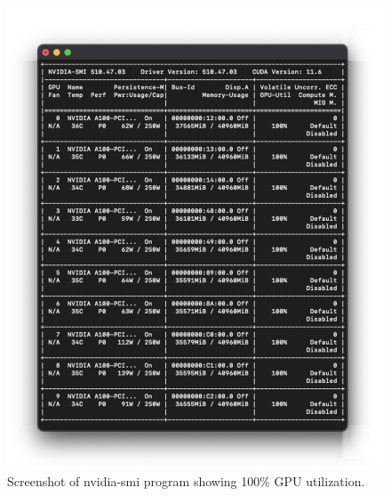 \begin{figure}[htbp]
    \centering
    \includegraphics[width=\textwidth]{figures/nvidia-smi.png}
    \caption{Screenshot of nvidia-smi program showing 100\% GPU utilization.}
    \label{fig:nvidia-smi}
\end{figure}

